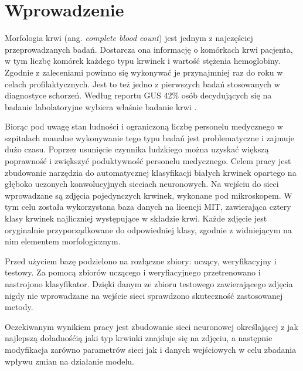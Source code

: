 \chapter{Wprowadzenie}
\label{cha:wprowadzenie}
Morfologia krwi (ang. \textit{complete blood count}) jest jednym z najczęściej przeprowadzanych badań. Dostarcza ona informację o komórkach krwi pacjenta, w tym liczbę komórek każdego typu krwinek i wartość stężenia hemoglobiny. Zgodnie z zaleceniami powinno się wykonywać je przynajmniej raz do roku w celach profilaktycznych. Jest to też jedno z pierwszych badań stosowanych w diagnostyce schorzeń. Według reportu GUS 42\% osób decydujących się na badanie labolatoryjne wybiera właśnie badanie krwi \cite{GUS_Zdrowie2016}.

\begin{center}
\end{center}


Biorąc pod uwagę stan ludności i ograniczoną liczbę personelu medycznego w szpitalach maualne wykonywanie tego typu badań jest problematyczne i zajmuje dużo czasu. Poprzez usunięcie czynnika ludzkiego można uzyskać większą poprawność i zwiększyć poduktywność personelu medycznego. Celem pracy jest zbudowanie narzędzia do automatycznej klasyfikacji białych krwinek opartego na głęboko uczonych konwolucyjnych sieciach neuronowych. Na wejściu do sieci wprowadzane są zdjęcia pojedynczych krwinek, wykonane pod mikroskopem. W tym celu została wykorzystana baza danych na licencji MIT, zawierająca cztery klasy krwinek najliczniej występujące w składzie krwi. Każde zdjęcie jest oryginalnie przyporządkowane do odpowiedniej klasy, zgodnie z widniejącym na nim elementem morfologicznym. 

Przed użyciem bazę podzielono na rozłączne zbiory: uczący, weryfikacyjny i testowy. Za pomocą zbiorów uczącego i weryfiacyjnego przetrenowano i nastrojono klasyfikator. Dzięki danym ze zbioru testowego zawierającego zdjęcia nigdy nie wprowadzane na wejście sieci sprawdzono skuteczność zastosowanej metody.

Oczekiwanym wynikiem pracy jest zbudowanie sieci neuronowej określającej z jak najlepszą doładnośćią jaki typ krwinki znajduje się na zdjęciu, a następnie modyfikacja zarówno parametrów sieci jak i danych wejściowych w celu zbadania wpływu zmian na działanie modelu.


